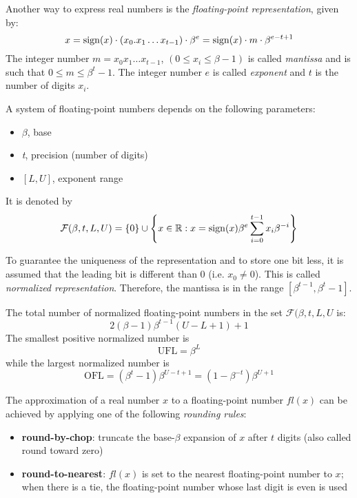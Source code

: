 Another way to express real numbers is the \textit{floating-point representation}, given by:
$$ x = \mathrm{sign}(x) \cdot (x_0.x_1 \hdots x_{t-1}) \cdot \beta^{e} = \mathrm{sign}(x) \cdot m \cdot \beta^{e-t+1} $$
The integer number $m=x_0x_1 \hdots x_{t-1}$, $(0 \leq x_i \leq \beta-1)$ is called \textit{mantissa} and is such that $0 \leq m \leq \beta^{t}-1$. The integer number $e$ is called \textit{exponent} and $t$ is the number of digits $x_i$.

A system of floating-point numbers depends on the following parameters:

\begin{itemize}
    \item $\beta$, base
    \item \textit{t}, precision (number of  digits)
    \item $[L, U]$, exponent range
\end{itemize}

It is denoted by
$$ \mathcal{F}(\beta, t, L, U) = \{0\} \cup \left\{ x \in \mathbb{R} : x = \mathrm{sign}(x)\beta^{e}\sum_{i=0}^{t-1}{x_i\beta^{-i}} \right\} $$

To guarantee the uniqueness of the representation  and to store one  bit less, it is assumed that the leading bit is different than $0$ (i.e. $x_0 \neq 0$). This is called \textit{normalized representation}. Therefore, the mantissa is in the range $[\beta^{t-1}, \beta^{t}-1]$. 



The total number of normalized floating-point numbers in the set $\mathcal{F}(\beta, t, L, U$ is:
$$ 2(\beta -1)\beta^{t-1}(U-L+1)+1 $$
The smallest positive normalized number is
$$ \textrm{UFL} = \beta^{L} $$
while the largest normalized number is
$$ \textrm{OFL} = (\beta^{t} - 1)\beta^{U-t+1} = (1 - \beta^{-t})\beta^{U+1} $$

The approximation of a real number $x$ to a floating-point number $fl(x)$ can be achieved by applying one of the following \textit{rounding rules}:

\begin{itemize}
    \item \textbf{round-by-chop}: truncate the base-$\beta$ expansion of $x$ after $t$ digits (also called round toward zero)
    \item \textbf{round-to-nearest}: $fl(x)$ is set to the nearest floating-point number to $x$; when there is a tie, the floating-point number whose last digit is even is used
\end{itemize}

